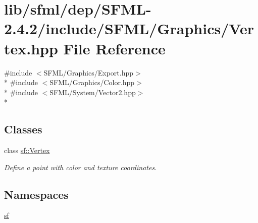 \hypertarget{sfml_2dep_2_s_f_m_l-2_84_82_2include_2_s_f_m_l_2_graphics_2_vertex_8hpp}{\section{lib/sfml/dep/\-S\-F\-M\-L-\/2.4.2/include/\-S\-F\-M\-L/\-Graphics/\-Vertex.hpp File Reference}
\label{sfml_2dep_2_s_f_m_l-2_84_82_2include_2_s_f_m_l_2_graphics_2_vertex_8hpp}
}
{\ttfamily \#include $<$S\-F\-M\-L/\-Graphics/\-Export.\-hpp$>$}\\*
{\ttfamily \#include $<$S\-F\-M\-L/\-Graphics/\-Color.\-hpp$>$}\\*
{\ttfamily \#include $<$S\-F\-M\-L/\-System/\-Vector2.\-hpp$>$}\\*
\subsection*{Classes}
\begin{DoxyCompactItemize}
\item 
class \hyperlink{classsf_1_1_vertex}{sf\-::\-Vertex}
\begin{DoxyCompactList}\small\item\em Define a point with color and texture coordinates. \end{DoxyCompactList}\end{DoxyCompactItemize}
\subsection*{Namespaces}
\begin{DoxyCompactItemize}
\item 
\hyperlink{namespacesf}{sf}
\end{DoxyCompactItemize}
